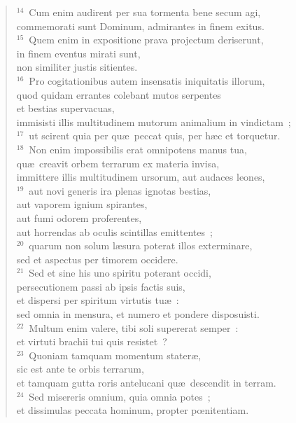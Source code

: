 \begin{verse}
${}^{14}$~Cum enim audirent per sua tormenta bene secum agi,\\ commemorati sunt Dominum, admirantes in finem exitus.\\
${}^{15}$~Quem enim in expositione prava projectum deriserunt,\\ in finem eventus mirati sunt,\\ non similiter justis sitientes.\\
${}^{16}$~Pro cogitationibus autem insensatis iniquitatis illorum,\\ quod quidam errantes colebant mutos serpentes\\ et bestias supervacuas,\\ immisisti illis multitudinem mutorum animalium in vindictam~;\\
${}^{17}$~ut scirent quia per qu\ae\ peccat quis, per h\ae c et torquetur.\\
${}^{18}$~Non enim impossibilis erat omnipotens manus tua,\\ qu\ae\ creavit orbem terrarum ex materia invisa,\\ immittere illis multitudinem ursorum, aut audaces leones,\\
${}^{19}$~aut novi generis ira plenas ignotas bestias,\\ aut vaporem ignium spirantes,\\ aut fumi odorem proferentes,\\ aut horrendas ab oculis scintillas emittentes~;\\
${}^{20}$~quarum non solum l\ae sura poterat illos exterminare,\\ sed et aspectus per timorem occidere.\\
${}^{21}$~Sed et sine his uno spiritu poterant occidi,\\ persecutionem passi ab ipsis factis suis,\\ et dispersi per spiritum virtutis tu\ae~:\\ sed omnia in mensura, et numero et pondere disposuisti.\\
${}^{22}$~Multum enim valere, tibi soli supererat semper~:\\ et virtuti brachii tui quis resistet~?\\
${}^{23}$~Quoniam tamquam momentum stater\ae ,\\ sic est ante te orbis terrarum,\\ et tamquam gutta roris antelucani qu\ae\ descendit in terram.\\
${}^{24}$~Sed misereris omnium, quia omnia potes~;\\ et dissimulas peccata hominum, propter pœnitentiam.\\

\end{verse}
